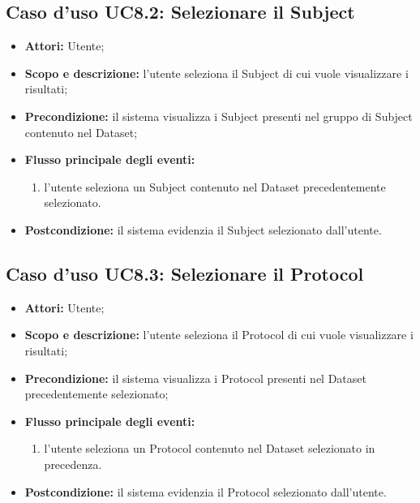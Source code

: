 \subsection{Caso d'uso UC8.2: Selezionare il Subject}
\begin{itemize}
\item \textbf{Attori:} Utente;
\item \textbf{Scopo e descrizione:} l'utente seleziona il Subject\glossario{} di cui vuole visualizzare i risultati;
\item \textbf{Precondizione:} il sistema visualizza i Subject\glossario{} presenti nel gruppo di Subject\glossario{} contenuto nel Dataset\glossario{};
\item \textbf{Flusso principale degli eventi:}
\begin{enumerate}
\item l'utente seleziona un Subject\glossario{} contenuto nel Dataset\glossario{} precedentemente selezionato.
\end{enumerate}
\item \textbf{Postcondizione:} il sistema evidenzia il Subject\glossario{} selezionato dall'utente.
\end{itemize}

\subsection{Caso d'uso UC8.3: Selezionare il Protocol}
\begin{itemize}
\item \textbf{Attori:} Utente;
\item \textbf{Scopo e descrizione:} l'utente seleziona il Protocol\glossario{} di cui vuole visualizzare i risultati;
\item \textbf{Precondizione:} il sistema visualizza i Protocol\glossario{} presenti nel Dataset\glossario{} precedentemente selezionato;
\item \textbf{Flusso principale degli eventi:}
\begin{enumerate}
\item l'utente seleziona un Protocol\glossario{} contenuto nel Dataset\glossario{} selezionato in precedenza.
\end{enumerate}
\item \textbf{Postcondizione:} il sistema evidenzia il Protocol\glossario{} selezionato dall'utente.
\end{itemize}

